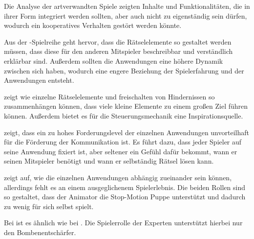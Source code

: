Die Analyse der artverwandten Spiele zeigten Inhalte und Funktionalitäten, die in ihrer Form integriert werden sollten, aber auch nicht zu eigenständig sein dürfen, wodurch ein kooperatives Verhalten gestört werden könnte.

Aus der -Spielreihe geht hervor, dass die Rätselelemente so gestaltet werden müssen, dass diese für den anderen Mitspieler beschreibbar und verständlich erklärbar sind. Außerdem sollten die Anwendungen eine höhere Dynamik zwischen sich haben, wodurch eine engere Beziehung der Spielerfahrung und der Anwendungen entsteht. 

 zeigt wie einzelne Rätselelemente und freischalten von Hindernissen so zusammenhängen können, dass viele kleine Elemente zu einem großen Ziel führen können. Außerdem bietet es für die Steuerungsmechanik eine Inspirationsquelle. 

 zeigt, dass ein zu hohes Forderungslevel der einzelnen Anwendungen unvorteilhaft für die Förderung der Kommunikation ist. Es führt dazu, dass jeder Spieler auf seine Anwendung fixiert ist, aber seltener ein Gefühl dafür bekommt, wann er seinen Mitspieler benötigt und wann er selbständig Rätsel lösen kann. 

 zeigt auf, wie die einzelnen Anwendungen abhängig zueinander sein können, allerdings fehlt es an einem ausgeglichenem Spielerlebnis. Die beiden Rollen sind so gestaltet, dass der Animator die Stop-Motion Puppe unterstützt und dadurch zu wenig für sich selbst spielt. 

Bei  ist es ähnlich wie bei . Die Spielerrolle der Experten unterstützt hierbei nur den Bombenentschärfer.




